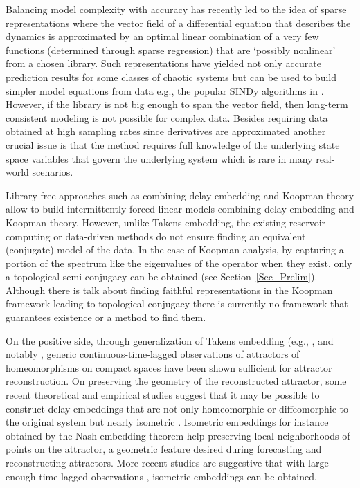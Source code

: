 \documentclass[12 pt]{article}
\begin{document}
Balancing model complexity with accuracy has recently led to the idea of sparse representations where the vector field of a differential equation that describes the dynamics is approximated by an optimal linear combination of a very few functions (determined through sparse regression) that are `possibly nonlinear'  from a chosen library. Such representations have yielded not only accurate prediction results for some classes of chaotic systems but can be used to build simpler model equations from data e.g., the popular SINDy algorithms in \cite{brunton2016discovering, champion2019data}. However, if the library is not big enough to span the vector field, then long-term consistent modeling is not possible for complex data. 
 Besides requiring data obtained at high sampling rates since derivatives are approximated another crucial issue is that the method requires full knowledge of the underlying state space variables that govern the underlying system which is rare in many real-world scenarios. 

Library free approaches such as combining delay-embedding and Koopman theory allow to build intermittently forced linear models \cite{brunton2017chaos,
 champion2019discovery} combining delay embedding and Koopman theory.  However, unlike Takens embedding, the existing reservoir computing or data-driven methods do not ensure finding an equivalent (conjugate) model of the data. In the case of Koopman analysis,  by capturing a portion of the spectrum like the eigenvalues \cite{budivsic2012applied,korda2020data} of the operator when they exist, only a topological semi-conjugacy can be obtained (see Section~\ref{Sec_Prelim}). Although there is  talk about finding  faithful representations in the Koopman framework leading to topological conjugacy \cite{mezic2020koopman}
there is currently no framework that guarantees existence or a method to find them. 

On the positive side, through  generalization of Takens embedding  (e.g., \cite{sauer1991embedology,stark1999delay,robinson2010dimensions,gutman2018embedding}, and notably \cite[Theorem 1]{gutman2018embedding}, generic continuous-time-lagged observations of attractors of homeomorphisms on compact spaces have been shown  sufficient for attractor reconstruction. On preserving the geometry of the reconstructed attractor, some recent theoretical and empirical studies suggest that it may be possible to construct delay embeddings that are not only homeomorphic or diffeomorphic to the original system but nearly isometric \cite{sauer1991embedology, baraniuk2009random}.  Isometric embeddings for instance obtained by the Nash embedding theorem help preserving local neighborhoods of points on the attractor, a geometric feature desired during forecasting and reconstructing attractors. More recent studies are suggestive that with large enough time-lagged observations
\cite{eftekhari2018stabilizing, yair2017reconstruction}, isometric embeddings can be obtained. 
\end{document}
